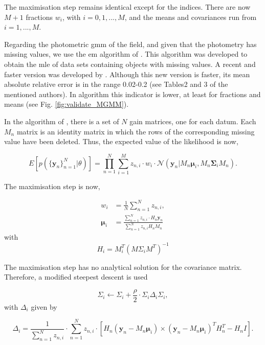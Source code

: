 The maximisation step remains identical except for the indices. There are now $M+1$ fractions $w_i$, with $i=0,1,...,M$, and the means and covariances run from $i=1,...,M$.

Regarding the photometric \gls{gmm} of the field, and given that the photometry has missing values, we use the \gls{em} algorithm of \citet{McMichael1996}. This algorithm was developed to obtain the \gls{mle} of data sets containing objects with missing values. A recent and faster version was developed by \citet{Lin2006}. Although this new version is faster, its mean absolute relative error is in the range 0.02-0.2 (see Tables2 and 3 of the mentioned authors). In \citet{McMichael1996} algorithm this indicator is lower, at least for fractions and means (see Fig. \ref{fig:validate_MGMM}).

In the algorithm of \citet{McMichael1996}, there is a set of $N$ gain matrices, one for each datum. Each $M_n$ matrix is an identity matrix in which the rows of the corresponding missing value have been deleted. Thus, the expected value of the likelihood is now,

\begin{equation}
E[p(\{\mathbf{y}_n\}_{n=1}^N|\theta)]=\prod_{n=1}^N {\sum_{i=1} ^M {z_{n,i}\cdot w_i\cdot \mathcal{N}(\mathbf{y}_n|M_n \boldsymbol{\mu}_i,M_n\boldsymbol{\Sigma}_i M_n)}}.
\end{equation}

The maximisation step is now,

\begin{align}
w_i &= \frac{1}{N} \sum_{n=1}^N z_{n,i}, \\
\boldsymbol{\mu}_i &= \frac{ \sum_{n=1}^N z_{n,i}\cdot H_n \mathbf{y}_n}{\sum_{n=1}^N z_{n,i} H_n M_n}
\end{align}
with 
\begin{equation}
H_i=M_i^T(M\Sigma_i M^T)^{-1}
\end{equation}

The maximisation step has no analytical solution for the covariance matrix. Therefore, a modified steepest descent is used

\begin{equation}
\Sigma_i \leftarrow \Sigma_i + \frac{\rho}{2}\cdot \Sigma_i\Delta_i\Sigma_i,
\end{equation}
with $\Delta_i$ given by

\begin{equation}
\Delta_i=  \frac{1}{\sum_{n=1}^N z_{n,i}}\cdot \sum_{n=1}^N z_{n,i} \cdot \left[H_n(\mathbf{y}_n -  M_n \boldsymbol{\mu}_i) \times  (\mathbf{y}_n -  M_n \boldsymbol{\mu}_i)^TH_n^T - H_nI\right].
\end{equation}
 
